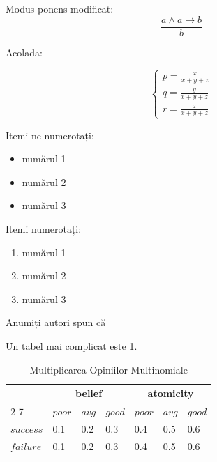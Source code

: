 Modus ponens modificat: 
\begin{equation} 
  \frac{a \land a \rightarrow b}
       {b}
\label{eq:e50}
\end{equation}

Acolada: 

\[\left \{ 
    \begin{array}{l}
        p =\frac{x}{x+y+z} \\
        q = \frac{y}{x+y+z}\\ 
        r = \frac{z}{x+y+z}
    \end{array}\right.
\]
        
Itemi ne-numerotați:  
\begin{itemize}
    \item numărul 1 
    \item numărul 2 
    \item numărul 3 
\end{itemize}

Itemi numerotați:
\begin{enumerate}
    \item numărul 1 
    \item numărul 2 
    \item numărul 3 
\end{enumerate}

Anumiți autori spun că  \cite{Zhou04} 


Un tabel mai complicat este \ref{Mom}.
\begin{table}
      \begin{center}
            \begin{tabular}{|l|l|l|l|l|l|l|}
                \hline 
                & \multicolumn{3}{c|}{belief} & \multicolumn{3}{c|}{atomicity} \\
                \cline{2-7}
                & $poor$ & $avg$ & $good$ & $poor$ & $avg$ & $good$ \\ 
        	\hline
                $success$   &  0.1    &  0.2    &  0.3    & 0.4    & 0.5    &  0.6     \\
                $failure$   &  0.1    &  0.2    &  0.3    & 0.4    & 0.5    &  0.6     \\
                                                    \hline
	    \end{tabular}
        \end{center}
    \caption{Multiplicarea Opiniilor Multinomiale}
    \label{Mom}
\end{table}

